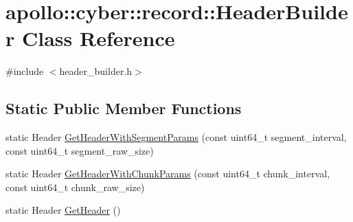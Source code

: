 \hypertarget{classapollo_1_1cyber_1_1record_1_1HeaderBuilder}{\section{apollo\-:\-:cyber\-:\-:record\-:\-:Header\-Builder Class Reference}
\label{classapollo_1_1cyber_1_1record_1_1HeaderBuilder}
}


{\ttfamily \#include $<$header\-\_\-builder.\-h$>$}

\subsection*{Static Public Member Functions}
\begin{DoxyCompactItemize}
\item 
static Header \hyperlink{classapollo_1_1cyber_1_1record_1_1HeaderBuilder_afdb6d4f30768fe543e20ae42c1a7f63b}{Get\-Header\-With\-Segment\-Params} (const uint64\-\_\-t segment\-\_\-interval, const uint64\-\_\-t segment\-\_\-raw\-\_\-size)
\item 
static Header \hyperlink{classapollo_1_1cyber_1_1record_1_1HeaderBuilder_af9ce70c917ba37246a9bc91e8a035e15}{Get\-Header\-With\-Chunk\-Params} (const uint64\-\_\-t chunk\-\_\-interval, const uint64\-\_\-t chunk\-\_\-raw\-\_\-size)
\item 
static Header \hyperlink{classapollo_1_1cyber_1_1record_1_1HeaderBuilder_a6912a76ae65bef9165f24654a02e2c8b}{Get\-Header} ()
\end{DoxyCompactItemize}
